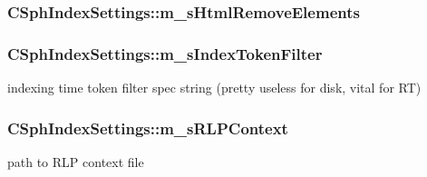 \hypertarget{structCSphIndexSettings_a578cf0f2e803907f7f2b7e5cd7bfbce6}{
\subsubsection[{m\-\_\-s\-Html\-Remove\-Elements}]{ C\-Sph\-Index\-Settings\-::m\-\_\-s\-Html\-Remove\-Elements}}\label{structCSphIndexSettings_a578cf0f2e803907f7f2b7e5cd7bfbce6}
\hypertarget{structCSphIndexSettings_ab9f1eef309f1845879a3429ec2211b7c}{
\subsubsection[{m\-\_\-s\-Index\-Token\-Filter}]{ C\-Sph\-Index\-Settings\-::m\-\_\-s\-Index\-Token\-Filter}}\label{structCSphIndexSettings_ab9f1eef309f1845879a3429ec2211b7c}


indexing time token filter spec string (pretty useless for disk, vital for R\-T) 

\hypertarget{structCSphIndexSettings_a83e4e399bd7d4fa6d4ef1f8cb26b6263}{
\subsubsection[{m\-\_\-s\-R\-L\-P\-Context}]{ C\-Sph\-Index\-Settings\-::m\-\_\-s\-R\-L\-P\-Context}}\label{structCSphIndexSettings_a83e4e399bd7d4fa6d4ef1f8cb26b6263}


path to R\-L\-P context file 

